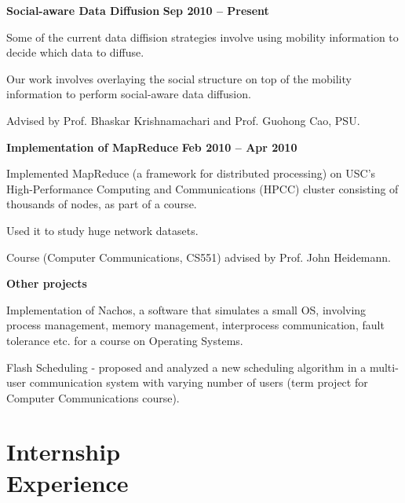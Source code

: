 \documentclass[margin,line]{resume}
\begin{document}
\begin{resume}
  \textbf{Social-aware Data Diffusion} \hfill \textbf{Sep 2010 -- Present}
  \begin{list2}
   \item Some of the current data diffision strategies involve using mobility information to decide which data to diffuse. 
   \item Our work involves overlaying the social structure on top of the mobility information to perform social-aware data diffusion.
   \item Advised by Prof. Bhaskar Krishnamachari and Prof. Guohong Cao, PSU.
  \end{list2}
  \newpage
  \textbf{Implementation of MapReduce} \hfill \textbf{Feb 2010 -- Apr 2010}
  \begin{list2}
  \item Implemented MapReduce (a framework for distributed processing) on USC's High-Performance Computing and Communications (HPCC) cluster consisting of thousands of nodes, as part of a course. 
  \item Used it to study huge network datasets. 
  \item Course (Computer Communications, CS551) advised by Prof. John Heidemann. 
  \end{list2}
 
  \textbf{Other projects} 
  \begin{list2}   
   \item Implementation of Nachos, a software that simulates a small OS, involving process management, memory management, interprocess communication, fault tolerance etc. for a course on Operating Systems.
   \item Flash Scheduling - proposed and analyzed a new scheduling algorithm in a multi-user communication system with varying number of users (term project for Computer Communications course).
  \end{list2}

 
 \vspace{5mm} 
\section{\mysidestyle Internship\\Experience}


\end{resume}
\end{document}
